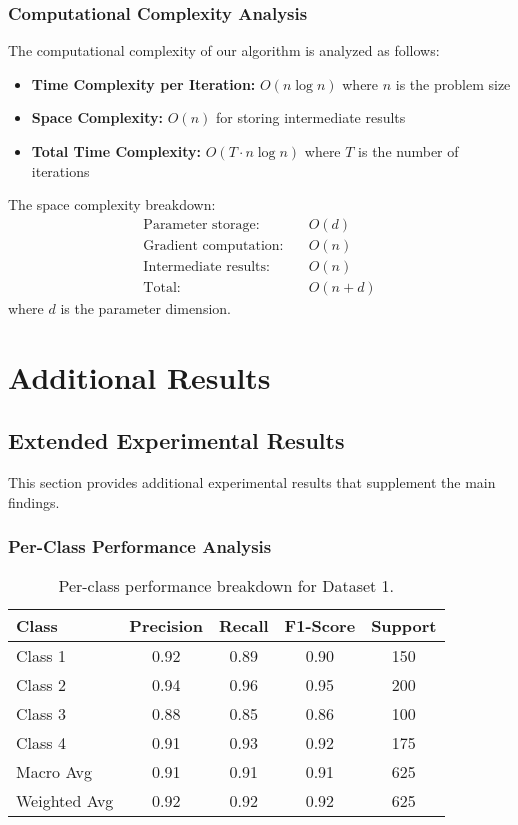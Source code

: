 \subsubsection{Computational Complexity Analysis}

The computational complexity of our algorithm is analyzed as follows:

\begin{itemize}
    \item \textbf{Time Complexity per Iteration:} $O(n \log n)$ where $n$ is the problem size
    \item \textbf{Space Complexity:} $O(n)$ for storing intermediate results
    \item \textbf{Total Time Complexity:} $O(T \cdot n \log n)$ where $T$ is the number of iterations
\end{itemize}

The space complexity breakdown:
\begin{align}
\text{Parameter storage:} &\quad O(d) \\
\text{Gradient computation:} &\quad O(n) \\
\text{Intermediate results:} &\quad O(n) \\
\text{Total:} &\quad O(n + d)
\end{align}
where $d$ is the parameter dimension.

\section{Additional Results}
\label{app:additional_results}

\subsection{Extended Experimental Results}
\label{app:extended_results}

This section provides additional experimental results that supplement the main findings.

\subsubsection{Per-Class Performance Analysis}

\begin{table}[htbp]
\centering
\caption{Per-class performance breakdown for Dataset 1.}
\label{tab:per_class}
\begin{tabular}{lcccc}
\toprule
Class & Precision & Recall & F1-Score & Support \\
\midrule
Class 1 & 0.92 & 0.89 & 0.90 & 150 \\
Class 2 & 0.94 & 0.96 & 0.95 & 200 \\
Class 3 & 0.88 & 0.85 & 0.86 & 100 \\
Class 4 & 0.91 & 0.93 & 0.92 & 175 \\
\midrule
Macro Avg & 0.91 & 0.91 & 0.91 & 625 \\
Weighted Avg & 0.92 & 0.92 & 0.92 & 625 \\
\bottomrule
\end{tabular}
\end{table}


